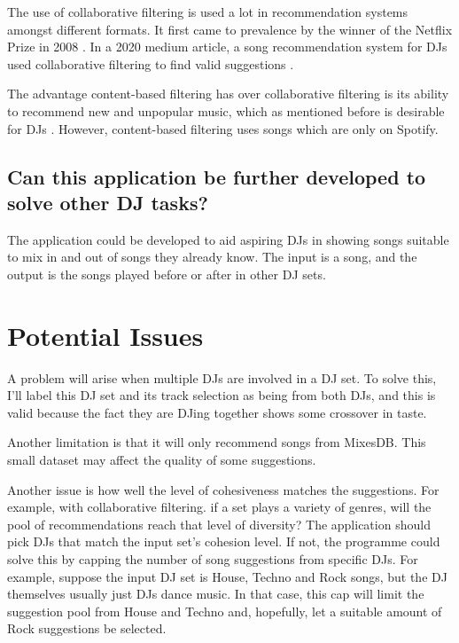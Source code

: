 \documentclass[11pt,titlepage,oneside]{book}
\begin{document}
	The use of collaborative filtering is used a lot in recommendation systems amongst different formats. It first came to prevalence by the winner of the Netflix Prize in 2008 \citep{zhou_large-scale_2008}. In a 2020 medium article, a song recommendation system for DJs used collaborative filtering to find valid suggestions \citep{chow_music_2020}.
	
	\begin{flushleft}
		The advantage content-based filtering has over collaborative filtering is its ability to recommend new and unpopular music, which as mentioned before is desirable for DJs  \citep{van_den_oord_deep_2013}. However, content-based filtering uses songs which are only on Spotify.
	\end{flushleft}
	
	
	\subsection{Can this application be further developed to solve other DJ tasks?}
	The application could be developed to aid aspiring DJs in showing songs suitable to mix in and out of songs they already know. The input is a song, and the output is the songs played before or after in other DJ sets.
	
\section{Potential Issues}
A problem will arise when multiple DJs are involved in a DJ set. To solve this, I'll label this DJ set and its track selection as being from both DJs, and this is valid because the fact they are DJing together shows some crossover in taste.

\begin{flushleft}
	Another limitation is that it will only recommend songs from MixesDB. This small dataset may affect the quality of some suggestions.
\end{flushleft}

\begin{flushleft}
	Another issue is how well the level of cohesiveness matches the suggestions. For example, with collaborative filtering. if a set plays a variety of genres, will the pool of recommendations reach that level of diversity? The application should pick DJs that match the input set's cohesion level. If not, the programme could solve this by capping the number of song suggestions from specific DJs. For example, suppose the input DJ set is House, Techno and Rock songs, but the DJ themselves usually just DJs dance music. In that case, this cap will limit the suggestion pool from House and Techno and, hopefully, let a suitable amount of Rock suggestions be selected. 
\end{flushleft}
\end{document}

